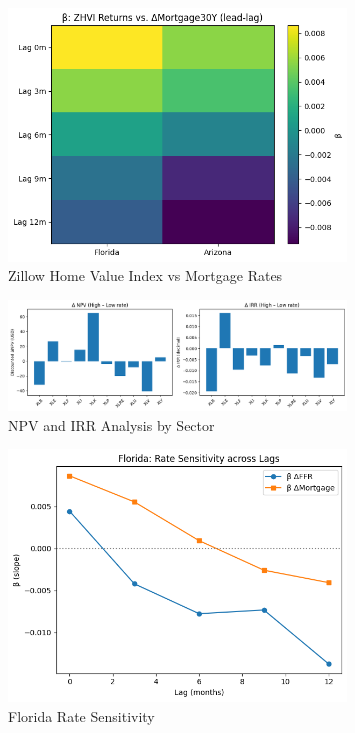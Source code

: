 \documentclass[12pt, stu, abstract]{apa7}
\begin{document}
\begin{appendices}
\begin{figure}[htbp]
    \centering
    \includegraphics[width=0.8\textwidth]{../figs/zhvi_vs_mort.png}
    \caption{Zillow Home Value Index vs Mortgage Rates}
    \label{fig:zhvi_mort}
\end{figure}

\begin{figure}[htbp]
    \centering
    \includegraphics[width=0.8\textwidth]{../figs/npv_iir_sector.png}
    \caption{NPV and IRR Analysis by Sector}
    \label{fig:npv_iir_sector}
\end{figure}

\begin{figure}[htbp]
    \centering
    \includegraphics[width=0.8\textwidth]{../figs/fl_rate_sens.png}
    \caption{Florida Rate Sensitivity}
    \label{fig:fl_rate_sens}
\end{figure}


\end{appendices}
\end{document}
